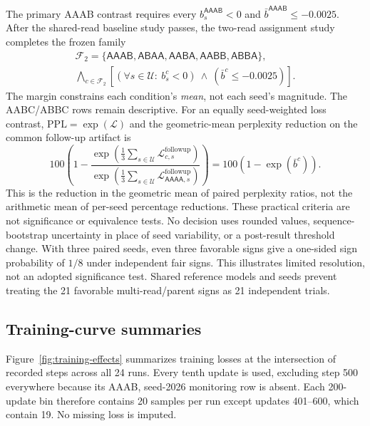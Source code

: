 \documentclass[11pt,letterpaper]{article}
\newcommand{\route}[1]{\textsf{#1}}
\newcommand{\Loss}{\mathcal{L}}
\begin{document}
The primary \route{AAAB} contrast requires every
$b_s^{\route{AAAB}}<0$ and $\bar b^{\route{AAAB}}\leq-0.0025$.
After the shared-read baseline study passes, the two-read assignment study
completes the frozen family
\begin{equation}
 \begin{gathered}
 \mathcal F_2=\{\route{AAAB},\route{ABAA},\route{AABA},\route{AABB},\route{ABBA}\},\\
 \bigwedge_{c\in\mathcal F_2}
 \left[(\forall s\in\mathcal U:\ b_s^c<0)\ \land\ (\bar b^c\leq-0.0025)\right].
 \end{gathered}
 \label{eq:two-read-family}
\end{equation}
The margin constrains each condition's \emph{mean}, not each seed's magnitude.
The \route{AABC}/\route{ABBC} rows remain descriptive. For an equally
seed-weighted loss contrast, $\mathrm{PPL}=\exp(\Loss)$ and the
geometric-mean perplexity reduction on the common follow-up artifact is
\begin{equation}
 100\left(1-\frac{\exp(\frac13\sum_{s\in\mathcal U}\Loss^{\mathrm{followup}}_{c,s})}
                       {\exp(\frac13\sum_{s\in\mathcal U}\Loss^{\mathrm{followup}}_{\route{AAAA},s})}\right)
 =100(1-\exp(\bar b^c)).
 \label{eq:geometric-ppl}
\end{equation}
This is the reduction in the geometric mean of paired perplexity ratios,
not the arithmetic mean of per-seed percentage reductions.
These practical criteria are not significance or equivalence tests.
No decision uses rounded values, sequence-bootstrap uncertainty in place of
seed variability, or a post-result threshold change.
With three paired seeds, even three favorable signs give a one-sided sign
probability of $1/8$ under independent fair signs. This illustrates limited
resolution, not an adopted significance test. Shared reference models and
seeds prevent treating the 21 favorable multi-read/parent signs as 21
independent trials.

\subsection{Training-curve summaries}
\label{app:training-curves}
Figure~\ref{fig:training-effects} summarizes training losses at the
intersection of recorded steps across all 24 runs. Every tenth update is
used, excluding step 500 everywhere because its \route{AAAB}, seed-2026
monitoring row is absent. Each 200-update bin therefore contains 20 samples
per run except updates 401--600, which contain 19. No missing loss is imputed.
\end{document}
